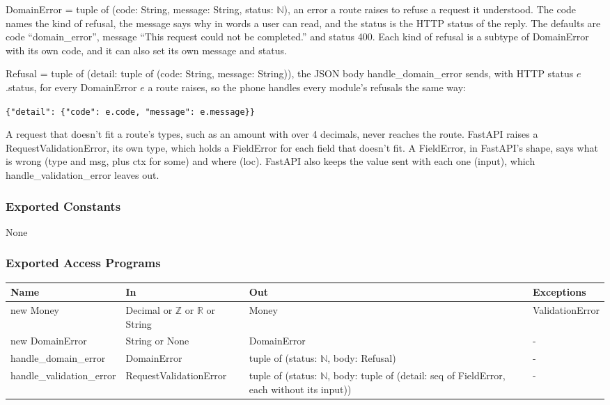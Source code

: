 \documentclass[12pt, titlepage]{article}
\begin{document}
\medskip
\noindent DomainError = tuple of (code: String, message: String, status:
$\mathbb{N}$), an error a route raises to refuse a request it understood. The
code names the kind of refusal, the message says why in words a user can read,
and the status is the HTTP status of the reply. The defaults are code
``domain\_error'', message ``This request could not be completed.'' and status
400. Each kind of refusal is a subtype of DomainError with its own code, and it
can also set its own message and status.

\medskip
\noindent Refusal = tuple of (detail: tuple of (code: String, message:
String)), the JSON body handle\_domain\_error sends, with HTTP status
$e$.status, for every DomainError $e$ a route raises, so the phone handles
every module's refusals the same way:

\begin{center}
\verb|{"detail": {"code": e.code, "message": e.message}}|
\end{center}

\noindent A request that doesn't fit a route's types, such as an amount with
over 4 decimals, never reaches the route. FastAPI raises a
RequestValidationError, its own type, which holds a FieldError for each field
that doesn't fit. A FieldError, in FastAPI's shape, says what is wrong (type and msg, plus ctx
for some) and where (loc). FastAPI also keeps the value sent with each one
(input), which handle\_validation\_error leaves out.

\subsubsection{Exported Constants}

None

\subsubsection{Exported Access Programs}

\begin{center}
\small
\setlength{\tabcolsep}{3pt}
\begin{tabular}{>{\raggedright\arraybackslash}p{4.0cm}
  >{\raggedright\arraybackslash}p{4.1cm}
  >{\raggedright\arraybackslash}p{4.8cm}
  >{\raggedright\arraybackslash}p{2.7cm}}
\toprule
\textbf{Name} & \textbf{In} & \textbf{Out} & \textbf{Exceptions} \\
\midrule
new Money & Decimal or $\mathbb{Z}$ or $\mathbb{R}$ or String & Money &
  ValidationError \\
new DomainError & String or None & DomainError & - \\
handle\_domain\_error & DomainError & tuple of (status: $\mathbb{N}$, body:
  Refusal) & - \\
handle\_validation\_error & RequestValidationError & tuple of (status:
  $\mathbb{N}$, body: tuple of (detail: seq of FieldError, each without its
  input)) & - \\
\bottomrule
\end{tabular}
\end{center}
\end{document}
